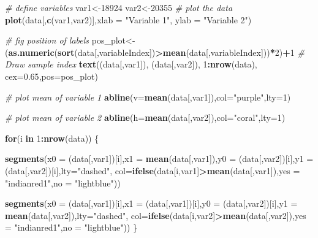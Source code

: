 \documentclass[
]{book}
\newenvironment{Shaded}{\begin{snugshade}}{\end{snugshade}}
\newcommand{\CommentTok}[1]{\textcolor[rgb]{0.56,0.35,0.01}{\textit{#1}}}
\newcommand{\ControlFlowTok}[1]{\textcolor[rgb]{0.13,0.29,0.53}{\textbf{#1}}}
\newcommand{\DataTypeTok}[1]{\textcolor[rgb]{0.13,0.29,0.53}{#1}}
\newcommand{\DecValTok}[1]{\textcolor[rgb]{0.00,0.00,0.81}{#1}}
\newcommand{\FloatTok}[1]{\textcolor[rgb]{0.00,0.00,0.81}{#1}}
\newcommand{\KeywordTok}[1]{\textcolor[rgb]{0.13,0.29,0.53}{\textbf{#1}}}
\newcommand{\NormalTok}[1]{#1}
\newcommand{\OperatorTok}[1]{\textcolor[rgb]{0.81,0.36,0.00}{\textbf{#1}}}
\newcommand{\StringTok}[1]{\textcolor[rgb]{0.31,0.60,0.02}{#1}}
\theoremstyle{definition}
\theoremstyle{definition}
\theoremstyle{definition}
\theoremstyle{remark}
\begin{document}
\begin{Shaded}
\begin{Highlighting}[]
\CommentTok{# define variables}
\NormalTok{var1<-}\DecValTok{18924}
\NormalTok{var2<-}\DecValTok{20355}
\CommentTok{# plot the data}
\KeywordTok{plot}\NormalTok{(data[,}\KeywordTok{c}\NormalTok{(var1,var2)],}\DataTypeTok{xlab =} \StringTok{"Variable 1"}\NormalTok{, }\DataTypeTok{ylab =} \StringTok{"Variable 2"}\NormalTok{)}

\CommentTok{# fig position of labels}
\NormalTok{pos_plot<-(}\KeywordTok{as.numeric}\NormalTok{(}\KeywordTok{sort}\NormalTok{(data[,variableIndex])}\OperatorTok{>}\KeywordTok{mean}\NormalTok{(data[,variableIndex]))}\OperatorTok{*}\DecValTok{2}\NormalTok{)}\OperatorTok{+}\DecValTok{1}
\CommentTok{# Draw sample index}
\KeywordTok{text}\NormalTok{((data[,var1]), (data[,var2]),  }\DecValTok{1}\OperatorTok{:}\KeywordTok{nrow}\NormalTok{(data),}
     \DataTypeTok{cex=}\FloatTok{0.65}\NormalTok{,}\DataTypeTok{pos=}\NormalTok{pos_plot)}

\CommentTok{# plot mean of variable 1}
\KeywordTok{abline}\NormalTok{(}\DataTypeTok{v=}\KeywordTok{mean}\NormalTok{(data[,var1]),}\DataTypeTok{col=}\StringTok{"purple"}\NormalTok{,}\DataTypeTok{lty=}\DecValTok{1}\NormalTok{)}

\CommentTok{# plot mean of variable 2}
\KeywordTok{abline}\NormalTok{(}\DataTypeTok{h=}\KeywordTok{mean}\NormalTok{(data[,var2]),}\DataTypeTok{col=}\StringTok{"coral"}\NormalTok{,}\DataTypeTok{lty=}\DecValTok{1}\NormalTok{)}

\ControlFlowTok{for}\NormalTok{(i }\ControlFlowTok{in} \DecValTok{1}\OperatorTok{:}\KeywordTok{nrow}\NormalTok{(data))}
\NormalTok{\{}
  
    \KeywordTok{segments}\NormalTok{(}\DataTypeTok{x0 =}\NormalTok{ (data[,var1])[i],}\DataTypeTok{x1 =} \KeywordTok{mean}\NormalTok{(data[,var1]),}\DataTypeTok{y0 =}\NormalTok{ (data[,var2])[i],}\DataTypeTok{y1 =}\NormalTok{  (data[,var2])[i],}\DataTypeTok{lty=}\StringTok{"dashed"}\NormalTok{,}
             \DataTypeTok{col=}\KeywordTok{ifelse}\NormalTok{(data[i,var1]}\OperatorTok{>}\KeywordTok{mean}\NormalTok{(data[,var1]),}\DataTypeTok{yes =} \StringTok{"indianred1"}\NormalTok{,}\DataTypeTok{no =} \StringTok{"lightblue"}\NormalTok{))}
  
  
    \KeywordTok{segments}\NormalTok{(}\DataTypeTok{x0 =}\NormalTok{ (data[,var1])[i],}\DataTypeTok{x1 =}\NormalTok{ (data[,var1])[i],}\DataTypeTok{y0 =}\NormalTok{ (data[,var2])[i],}\DataTypeTok{y1 =}  \KeywordTok{mean}\NormalTok{(data[,var2]),}\DataTypeTok{lty=}\StringTok{"dashed"}\NormalTok{,}
             \DataTypeTok{col=}\KeywordTok{ifelse}\NormalTok{(data[i,var2]}\OperatorTok{>}\KeywordTok{mean}\NormalTok{(data[,var2]),}\DataTypeTok{yes =} \StringTok{"indianred1"}\NormalTok{,}\DataTypeTok{no =} \StringTok{"lightblue"}\NormalTok{))}
\NormalTok{\}}


\end{Highlighting}
\end{Shaded}
\end{document}
